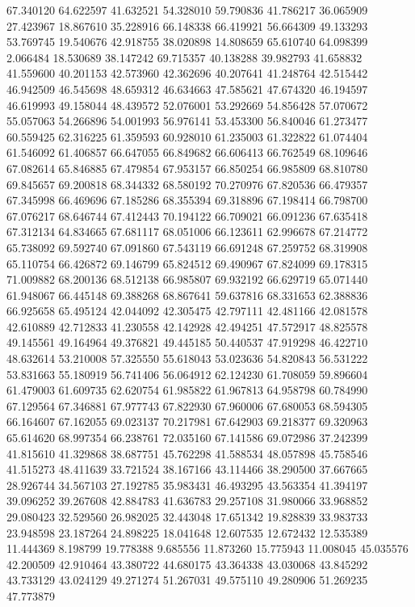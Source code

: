 67.340120
64.622597
41.632521
54.328010
59.790836
41.786217
36.065909
27.423967
18.867610
35.228916
66.148338
66.419921
56.664309
49.133293
53.769745
19.540676
42.918755
38.020898
14.808659
65.610740
64.098399
2.066484
18.530689
38.147242
69.715357
40.138288
39.982793
41.658832
41.559600
40.201153
42.573960
42.362696
40.207641
41.248764
42.515442
46.942509
46.545698
48.659312
46.634663
47.585621
47.674320
46.194597
46.619993
49.158044
48.439572
52.076001
53.292669
54.856428
57.070672
55.057063
54.266896
54.001993
56.976141
53.453300
56.840046
61.273477
60.559425
62.316225
61.359593
60.928010
61.235003
61.322822
61.074404
61.546092
61.406857
66.647055
66.849682
66.606413
66.762549
68.109646
67.082614
65.846885
67.479854
67.953157
66.850254
66.985809
68.810780
69.845657
69.200818
68.344332
68.580192
70.270976
67.820536
66.479357
67.345998
66.469696
67.185286
68.355394
69.318896
67.198414
66.798700
67.076217
68.646744
67.412443
70.194122
66.709021
66.091236
67.635418
67.312134
64.834665
67.681117
68.051006
66.123611
62.996678
67.214772
65.738092
69.592740
67.091860
67.543119
66.691248
67.259752
68.319908
65.110754
66.426872
69.146799
65.824512
69.490967
67.824099
69.178315
71.009882
68.200136
68.512138
66.985807
69.932192
66.629719
65.071440
61.948067
66.445148
69.388268
68.867641
59.637816
68.331653
62.388836
66.925658
65.495124
42.044092
42.305475
42.797111
42.481166
42.081578
42.610889
42.712833
41.230558
42.142928
42.494251
47.572917
48.825578
49.145561
49.164964
49.376821
49.445185
50.440537
47.919298
46.422710
48.632614
53.210008
57.325550
55.618043
53.023636
54.820843
56.531222
53.831663
55.180919
56.741406
56.064912
62.124230
61.708059
59.896604
61.479003
61.609735
62.620754
61.985822
61.967813
64.958798
60.784990
67.129564
67.346881
67.977743
67.822930
67.960006
67.680053
68.594305
66.164607
67.162055
69.023137
70.217981
67.642903
69.218377
69.320963
65.614620
68.997354
66.238761
72.035160
67.141586
69.072986
37.242399
41.815610
41.329868
38.687751
45.762298
41.588534
48.057898
45.758546
41.515273
48.411639
33.721524
38.167166
43.114466
38.290500
37.667665
28.926744
34.567103
27.192785
35.983431
46.493295
43.563354
41.394197
39.096252
39.267608
42.884783
41.636783
29.257108
31.980066
33.968852
29.080423
32.529560
26.982025
32.443048
17.651342
19.828839
33.983733
23.948598
23.187264
24.898225
18.041648
12.607535
12.672432
12.535389
11.444369
8.198799
19.778388
9.685556
11.873260
15.775943
11.008045
45.035576
42.200509
42.910464
43.380722
44.680175
43.364338
43.030068
43.845292
43.733129
43.024129
49.271274
51.267031
49.575110
49.280906
51.269235
47.773879
